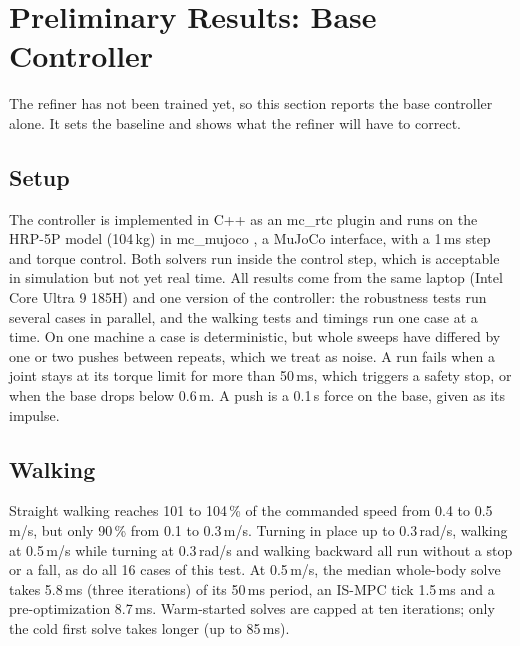 \documentclass[conference]{IEEEtran}
\begin{document}
\section{Preliminary Results: Base Controller}
\label{sec:results}

The refiner has not been trained yet, so this section reports the base controller alone.
It sets the baseline and shows what the refiner will have to correct.

\subsection{Setup}
The controller is implemented in C++ as an mc\_rtc plugin and runs on the HRP-5P model (104\,kg) in mc\_mujoco \cite{singh2022mcmujoco}, a MuJoCo \cite{todorov2012mujoco} interface, with a 1\,ms step and torque control.
Both solvers run inside the control step, which is acceptable in simulation but not yet real time.
All results come from the same laptop (Intel Core Ultra 9 185H) and one version of the controller: the robustness tests run several cases in parallel, and the walking tests and timings run one case at a time.
On one machine a case is deterministic, but whole sweeps have differed by one or two pushes between repeats, which we treat as noise.
A run fails when a joint stays at its torque limit for more than 50\,ms, which triggers a safety stop, or when the base drops below 0.6\,m.
A push is a 0.1\,s force on the base, given as its impulse.

\subsection{Walking}
Straight walking reaches 101 to 104\,\% of the commanded speed from 0.4 to 0.5\,m/s, but only 90\,\% from 0.1 to 0.3\,m/s.
Turning in place up to 0.3\,rad/s, walking at 0.5\,m/s while turning at 0.3\,rad/s and walking backward all run without a stop or a fall, as do all 16 cases of this test.
At 0.5\,m/s, the median whole-body solve takes 5.8\,ms (three iterations) of its 50\,ms period, an IS-MPC tick 1.5\,ms and a pre-optimization 8.7\,ms.
Warm-started solves are capped at ten iterations; only the cold first solve takes longer (up to 85\,ms).
\end{document}
